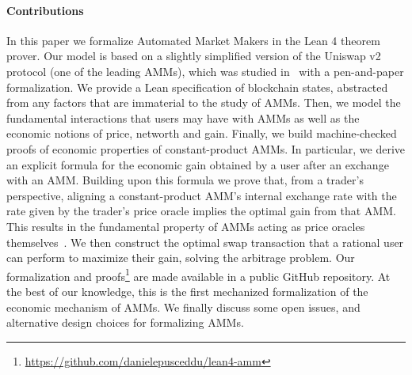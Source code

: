 \paragraph*{Contributions}
In this paper we formalize Automated Market Makers in the Lean 4 theorem prover.
Our model is based on a slightly simplified version of the Uniswap v2 protocol (one of the leading AMMs), which was studied in~\cite{Bartoletti_2022} with a pen-and-paper formalization. We provide a Lean specification of blockchain states, abstracted from any factors that are immaterial to the study of AMMs. Then, we model the fundamental interactions that users may have with AMMs as well as the economic notions of price, networth and gain. Finally, we build machine-checked proofs of economic properties of constant-product AMMs. In particular, we derive an explicit formula for the economic gain obtained by a user after an exchange with an AMM. Building upon this formula we prove that, from a trader's perspective, aligning a constant-product AMM's internal exchange rate with the rate given by the trader's price oracle implies the optimal gain from that AMM. This results in the fundamental property of AMMs acting as price oracles themselves~\cite{Angeris20aft}. We then construct the optimal swap transaction that a rational user can perform to maximize their gain, solving the arbitrage problem. Our formalization and proofs\footnote{\url{https://github.com/danielepusceddu/lean4-amm}} are made available in a public GitHub repository.
At the best of our knowledge, this is the first mechanized formalization of the economic mechanism of AMMs.
We finally discuss some open issues, and alternative design choices for formalizing AMMs.

